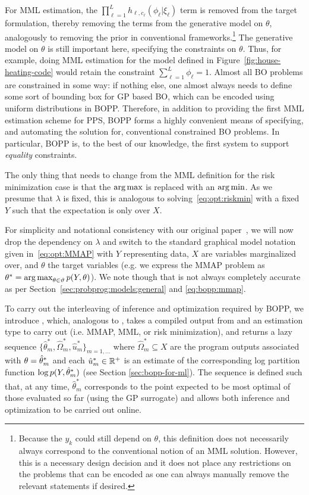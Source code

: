 For MML estimation, the $\prod_{\ell=1}^{L} h_{\ell,c_{\ell}} (\phi_{\ell} | \xi_{\ell})$
term is removed from the target formulation, thereby removing the terms from the generative
model on $\theta$, analogously to removing the prior in conventional frameworks.\footnote{Because the 
	$y_k$ could still depend on $\theta$, this definition does not necessarily always correspond to 
	the conventional notion of an MML solution.
	However, this is a necessary design decision and it does not place any restrictions on the 
	problems that can be encoded as one can always manually remove the relevant 
	\observe statements if desired.}
The generative
model on $\theta$ is still important here, specifying the constraints
on $\theta$.  Thus, for example, doing MML estimation for the model defined in 
Figure~\ref{fig:house-heating-code} would retain the constraint $\sum_{\ell=1}^{L} \phi_{\ell} = 1$.
Almost all BO problems
are constrained in some way: if nothing else, one almost always needs to define some sort of bounding
box for GP based BO, which can be encoded using uniform distributions in BOPP.   
Therefore, in addition to providing the first  MML estimation scheme for PPS, BOPP forms a highly convenient means
of specifying, and automating the solution for, conventional constrained BO problems.  In particular,
BOPP is, to the best of our knowledge, the first system to support \emph{equality} constraints.

The only thing that
needs to change from the MML definition for the risk minimization case is that the $\operatorname*{arg\,max}$ is replaced with an $\operatorname*{arg\,min}$.
As we presume that $\lambda$ is fixed, this is analogous to solving~\eqref{eq:opt:riskmin} with a fixed $Y$ such that
the expectation is only over $X$.

For simplicity and notational consistency with our original paper~\citep{rainforth2016bayesian}, 
we will now drop the dependency on $\lambda$ and switch to
the standard graphical model notation given in~\eqref{eq:opt:MMAP}
with $Y$ representing data, $X$ are variables marginalized over, and $\theta$ the target variables
(e.g. we express the MMAP problem as $\theta^* = \operatorname*{arg\,max}_{\theta \in \vartheta}
p(Y,\theta)$).
We note though that
is not always completely accurate as per Section~\ref{sec:probprog:models:general} and 
\eqref{eq:bopp:mmap}.

To carry out the interleaving of inference and optimization required by BOPP, we
introduce \doopt, which, analogous to \doquery, takes a compiled output from  and
an estimation type to carry out (i.e. MMAP, MML, or risk minimization), and
returns a lazy sequence $\{\hat{\theta}^*_m,\hat{\Omega}^*_m,\hat{u}^*_m\}_{m=1,\dots}$
where $\hat{\Omega}^*_m \subseteq X$ are the program outputs associated with
$\theta=\hat{\theta}^*_m$ and each $\hat{u}^*_m \in \mathbb{R}^+$ is an estimate of the corresponding
log partition function $\log p(Y, \hat{\theta}_m^*)$ (see Section \ref{sec:bopp-for-ml}).  The
sequence is
defined such that, at any time, $\hat{\theta}^*_m$ corresponds to the point expected to be
most optimal of those evaluated so far (using the GP surrogate) and allows both inference and optimization to be
carried out online.
